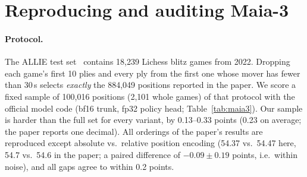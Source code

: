 \section{Reproducing and auditing Maia-3}\label{sec:audit}


\paragraph{Protocol.} The ALLIE test set~\cite{allie} contains 18,239 Lichess blitz games from 2022.
Dropping each game's first 10 plies and every ply from the first one whose mover has fewer than 30\,s
selects \emph{exactly} the 884,049 positions reported in the paper. We score a fixed sample of
100,016 positions (2,101 whole games) of that protocol with the official model code (bf16 trunk,
fp32 policy head; Table~\ref{tab:maia3}). Our sample is harder than the full set for every variant,
by 0.13--0.33 points (0.23 on average; the paper reports one decimal). All orderings of the paper's
results are reproduced except absolute vs.\ relative position encoding (54.37 vs.\ 54.47 here, 54.7
vs.\ 54.6 in the paper; a paired difference of $-0.09\pm0.19$ points, i.e.\ within noise), and all
gaps agree to within 0.2 points.

